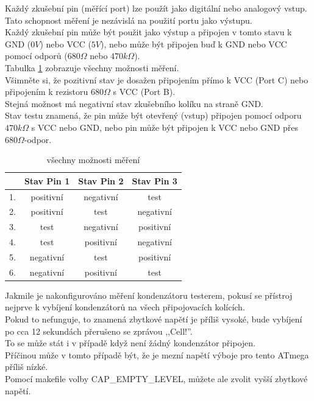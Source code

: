Každý zkušební pin (měřící port) lze použít jako digitální nebo analogový vstup.\\
Tato schopnost měření je nezávislá na použití portu jako výstupu.\\
Každý zkušební pin může být použit jako výstup a připojen v tomto stavu k GND (\(0V\)) nebo VCC (\(5V\)),
nebo může být připojen buď k GND nebo VCC pomocí odporů (\(680\Omega\) nebo \(470k\Omega\)).\\
Tabulka \ref{tab:case} zobrazuje všechny možnosti měření.\\
Všimněte si, že pozitivní stav je dosažen připojením přímo k VCC (Port C) nebo
připojením k rezistoru \(680\Omega\) s VCC (Port B).\\
Stejná možnost má negativní stav zkušebního kolíku na straně GND.\\
Stav testu znamená, že pin může být otevřený (vstup) připojen pomocí odporu \(470k\Omega\) s VCC nebo GND, nebo pin může být připojen k VCC nebo GND přes \(680\Omega\)-odpor.\\

\begin{table}[H]
  \begin{center}
    \begin{tabular}{| l | c | c | c |}
    \hline
      & Stav Pin 1 & Stav Pin 2 & Stav Pin 3 \\
    \hline
   1. & positivní    &  negativní   &  test \\
   2. & positivní    &  test      & negativní \\
   3. & test       &  negativní   & positivní \\
   4. & test       &  positivní   & negativní \\
   5. & negativní    &  test      & positivní \\
   6. & negativní    &  positivní   &  test  \\
    \hline
    \end{tabular}
  \end{center}
  \caption{všechny možnosti měření}
  \label{tab:case} 
\end{table}

Jakmile je nakonfigurováno měření kondenzátoru testerem,  pokusí se přístroj nejprve
k vybíjení kondenzátorů na všech připojovacích kolících.\\ Pokud to nefunguje, to znamená zbytkové napětí je příliš vysoké, bude vybíjení po cca 12 sekundách přerušeno se zprávou ,,Cell!''.\\

To se může stát i v případě když není žádný kondenzátor připojen.\\

Příčinou může v tomto případě být, že je mezní napětí výboje pro tento
ATmega příliš nízké.\\ Pomocí makefile volby CAP\_EMPTY\_LEVEL, můžete ale zvolit vyšší zbytkové napětí.
